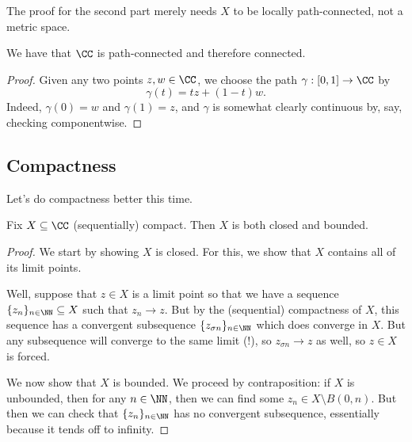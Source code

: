 \begin{remark}
	The proof for the second part merely needs $X$ to be locally path-connected, not a metric space.
\end{remark}
\begin{corollary}
	We have that $\CC$ is path-connected and therefore connected.
\end{corollary}
\begin{proof}
	Given any two points $z,w\in\CC$, we choose the path $\gamma:[0,1]\to\CC$ by
	\[\gamma(t)=tz+(1-t)w.\]
	Indeed, $\gamma(0)=w$ and $\gamma(1)=z$, and $\gamma$ is somewhat clearly continuous by, say, checking componentwise.
\end{proof}

\subsection{Compactness}
Let's do compactness better this time.
\begin{lemma}
	Fix $X\subseteq\CC$ (sequentially) compact. Then $X$ is both closed and bounded.
\end{lemma}
\begin{proof}
	We start by showing $X$ is closed. For this, we show that $X$ contains all of its limit points.
	
	Well, suppose that $z\in X$ is a limit point so that we have a sequence $\{z_n\}_{n\in\NN}\subseteq X$ such that $z_n\to z$. But by the (sequential) compactness of $X$, this sequence has a convergent subsequence $\{z_{\sigma n}\}_{n\in\NN}$ which does converge in $X$. But any subsequence will converge to the same limit (!), so $z_{\sigma n}\to z$ as well, so $z\in X$ is forced.

	We now show that $X$ is bounded. We proceed by contraposition: if $X$ is unbounded, then for any $n\in\NN$, then we can find some $z_n\in X\setminus B(0,n)$. But then we can check that $\{z_n\}_{n\in\NN}$ has no convergent subsequence, essentially because it tends off to infinity.
\end{proof}

